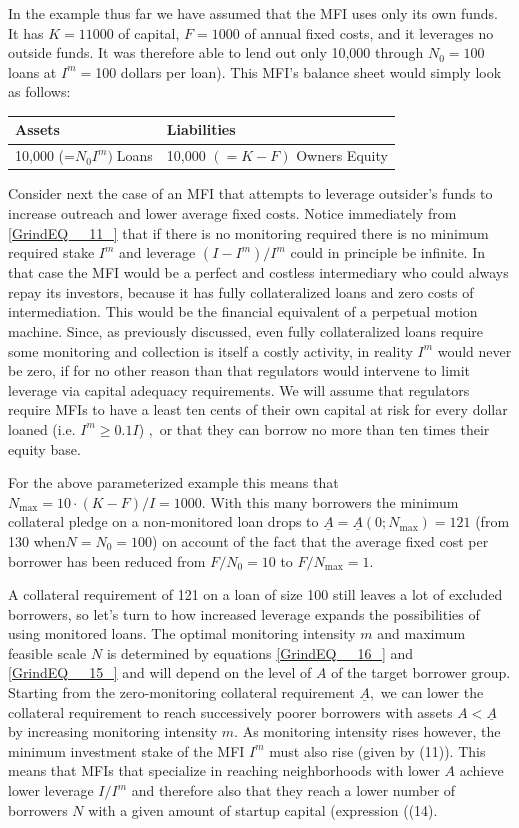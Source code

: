 \documentclass{article} %
\begin{document}
In the example thus far we have assumed that the MFI uses only its own funds.  It has $K=11000$ of capital, $F=1000$ of annual fixed costs, and it leverages no outside funds. It was therefore able to lend out only 10,000 through $N_{0} =100$ loans at $I^{m} =$100 dollars per loan). This MFI's balance sheet would simply look as follows: 

\begin{tabular}{|p{2.1in}|p{2.1in}|} \hline 
\textbf{Assets} & \textbf{Liabilities} \\ \hline 
10,000 (=$N_{0} I^{m} )\; $Loans & 10,000 $(=K-F)$ Owners Equity \\ \hline 
\end{tabular}



Consider next the case of an MFI that attempts to leverage outsider's funds to increase outreach and lower average fixed costs.  Notice immediately from \eqref{GrindEQ__11_} that if there is no monitoring required there is no minimum required stake $I^{m} $ and leverage $(I-I^{m} )/I^{m} $ could in principle be infinite.  In that case the MFI would be a perfect and costless intermediary who could always repay its investors, because it has fully collateralized loans and zero costs of intermediation.  This would be the financial equivalent of a perpetual motion machine.  Since, as previously discussed, even fully collateralized loans require some monitoring and collection is itself a costly activity, in reality $I^{m} $ would never be zero,  if for no other reason than that regulators would intervene to limit leverage via capital adequacy requirements.  We will assume that regulators require MFIs to have a least ten cents of their own capital at risk for every dollar loaned (i.e. $I^{m} \ge 0.1I$) $,$ or that they can borrow no more than ten times their equity base.  

For the above parameterized example this means that $N_{\max } =10\cdot (K-F)/I=1000.$ With this many borrowers the minimum collateral pledge on a non-monitored loan drops to $\underline{A}=\underline{A}(0;N_{\max } )=121$ (from 130 when$N=N_{0} =100$) on account of the fact that the average fixed cost per borrower has been reduced from $F/N_{0} =10$ to $F/N_{\max } =1$.  

A collateral requirement of 121 on a loan of size 100 still leaves a lot of excluded borrowers, so let's turn to how increased leverage expands the possibilities of using monitored loans. The optimal monitoring intensity $m$ and maximum feasible scale $N$ is determined by equations \eqref{GrindEQ__16_} and \eqref{GrindEQ__15_} and will depend on the level of $A$ of the target borrower group.  Starting from the zero-monitoring collateral requirement $\underline{A},$ we can lower the collateral requirement to reach successively poorer borrowers with assets $A<\underline{A}$ by increasing monitoring intensity $m.$  As monitoring intensity rises however, the minimum investment stake of the MFI $I^{m} $ must also rise (given by (11)). This means that MFIs that specialize in reaching neighborhoods with lower $A$ achieve lower leverage $I/I^{m} $ and therefore also that they reach a lower number of borrowers $N$ with a given amount of startup capital (expression ((14).  
\end{document}
